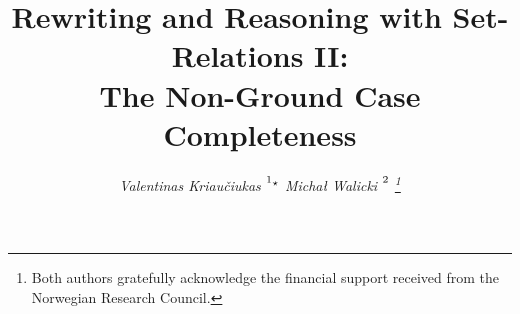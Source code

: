 


\title{Rewriting and Reasoning with Set-Relations II: \\
The Non-Ground Case Completeness}


%
\author{\large\it Valentinas Kriau\v ciukas $\strut^1{}^\star$\qquad 
 Micha{\l} Walicki \(\strut^2\)\relax
\thanks{Both authors gratefully acknowledge the financial support received
from the Norwegian Research Council.}}


\maketitle

